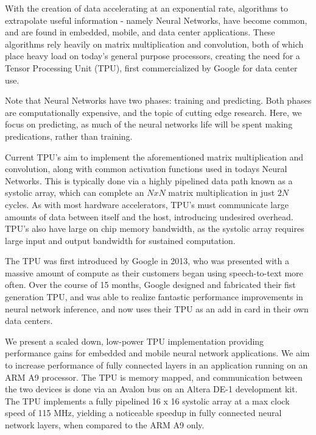 \documentclass[11pt, conference, onecolumn]{IEEEtran}
\begin{document}
    With the creation of data accelerating at an exponential rate, algorithms to
    extrapolate useful information - namely Neural Networks, have become
    common, and are found in embedded, mobile, and data center applications. These
    algorithms rely heavily on matrix multiplication and convolution, both of which place
    heavy load on today's general purpose processors, creating the need for a Tensor
    Processing Unit (TPU), first commercialized by Google for data center use.

    Note that Neural Networks have two phases: training and predicting. Both phases are
    computationally expensive, and the topic of cutting edge research. Here, we focus
    on predicting, as much of the neural networks life will be spent making predications,
    rather than training.

    Current TPU's aim to implement the aforementioned matrix multiplication and
    convolution, along with common activation functions used in todays Neural Networks.
    This is typically done via a highly pipelined data path known as a systolic array,
    which can complete an $N x N$ matrix multiplication in just $2N$ cycles. As with most
    hardware accelerators, TPU's must communicate large amounts of data between itself and
    the host, introducing undesired overhead. TPU's also have large on chip memory
    bandwidth, as the systolic array requires large input and output bandwidth for sustained
    computation.

    The TPU was first introduced by Google in 2013, who was presented with a massive
    amount of compute as their customers began using speech-to-text more often. Over the
    course of 15 months, Google designed and fabricated their fist generation TPU, and
    was able to realize fantastic performance improvements in neural network inference,
    and now uses their TPU as an add in card in their own data centers.

    We present a scaled down, low-power TPU implementation providing performance gains for
    embedded and mobile neural network applications. We aim to increase performance of
    fully connected layers in an application running on an ARM A9 processor. The TPU is
    memory mapped, and communication between the two devices is done via an Avalon bus on
    an Altera DE-1 development kit. The TPU implements a fully pipelined 16 x 16 systolic
    array at a max clock speed of 115 MHz, yielding a noticeable speedup in
    fully connected neural network layers, when compared to the ARM A9 only.
\end{document}
